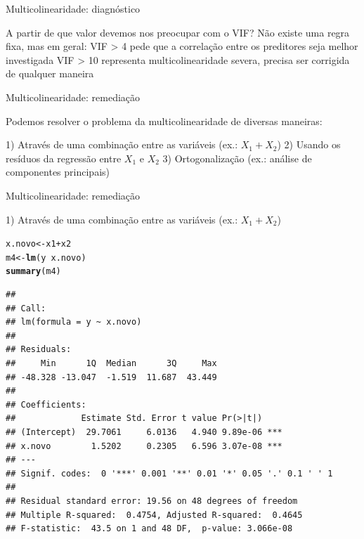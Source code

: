 \documentclass{beamer}\usepackage[]{graphicx}\usepackage[]{color}
\makeatletter
\newcommand{\hlopt}[1]{\textcolor[rgb]{0,0,0}{#1}}%
\newcommand{\hlstd}[1]{\textcolor[rgb]{0.345,0.345,0.345}{#1}}%
\newcommand{\hlkwb}[1]{\textcolor[rgb]{0.69,0.353,0.396}{#1}}%
\newcommand{\hlkwd}[1]{\textcolor[rgb]{0.737,0.353,0.396}{\textbf{#1}}}%
\newenvironment{kframe}{%
 \def\at@end@of@kframe{}%
 \ifinner\ifhmode%
  \def\at@end@of@kframe{\end{minipage}}%
  \begin{minipage}{\columnwidth}%
 \fi\fi%
 \def\FrameCommand##1{\hskip\@totalleftmargin \hskip-\fboxsep
 \colorbox{shadecolor}{##1}\hskip-\fboxsep
     \hskip-\linewidth \hskip-\@totalleftmargin \hskip\columnwidth}%
 \MakeFramed {\advance\hsize-\width
   \@totalleftmargin\z@ \linewidth\hsize
   \@setminipage}}%
 {\par\unskip\endMakeFramed%
 \at@end@of@kframe}
\newenvironment{knitrout}{}{} %
\renewenvironment{knitrout}{\setlength{\topsep}{0mm}}{}
\makeatother
\begin{document}
\begin{frame}{Multicolinearidade: diagnóstico}

A partir de que valor devemos nos preocupar com o VIF? \pause
\vfill
Não existe uma regra fixa, mas em geral: \pause
\vfill
VIF > 4 pede que a correlação entre os preditores seja melhor investigada \pause
\vfill
VIF > 10 representa multicolinearidade severa, precisa ser corrigida de qualquer maneira 

\end{frame}


\begin{frame}[fragile]{Multicolinearidade: remediação}

 Podemos resolver o problema da multicolinearidade de diversas maneiras: \pause

\vfill

1) Através de uma combinação entre as variáveis (ex.: $X_1 + X_2$) \pause
\vfill
2) Usando os resíduos da regressão entre $X_1$ e $X_2$ \pause
\vfill
3) Ortogonalização (ex.: análise de componentes principais)
 

\end{frame}


\begin{frame}[fragile]{Multicolinearidade: remediação}

1) Através de uma combinação entre as variáveis (ex.: $X_1 + X_2$)
 
\begin{knitrout}\tiny
{}\color{fgcolor}\begin{kframe}
\begin{alltt}
\hlstd{x.novo} \hlkwb{<-} \hlstd{x1} \hlopt{+} \hlstd{x2}
\hlstd{m4} \hlkwb{<-} \hlkwd{lm}\hlstd{(y} \hlopt{~} \hlstd{x.novo)}
\hlkwd{summary}\hlstd{(m4)}
\end{alltt}
\begin{verbatim}
## 
## Call:
## lm(formula = y ~ x.novo)
## 
## Residuals:
##     Min      1Q  Median      3Q     Max 
## -48.328 -13.047  -1.519  11.687  43.449 
## 
## Coefficients:
##             Estimate Std. Error t value Pr(>|t|)    
## (Intercept)  29.7061     6.0136   4.940 9.89e-06 ***
## x.novo        1.5202     0.2305   6.596 3.07e-08 ***
## ---
## Signif. codes:  0 '***' 0.001 '**' 0.01 '*' 0.05 '.' 0.1 ' ' 1
## 
## Residual standard error: 19.56 on 48 degrees of freedom
## Multiple R-squared:  0.4754,	Adjusted R-squared:  0.4645 
## F-statistic:  43.5 on 1 and 48 DF,  p-value: 3.066e-08
\end{verbatim}
\end{kframe}
\end{knitrout}
 

\end{frame}
\end{document}
